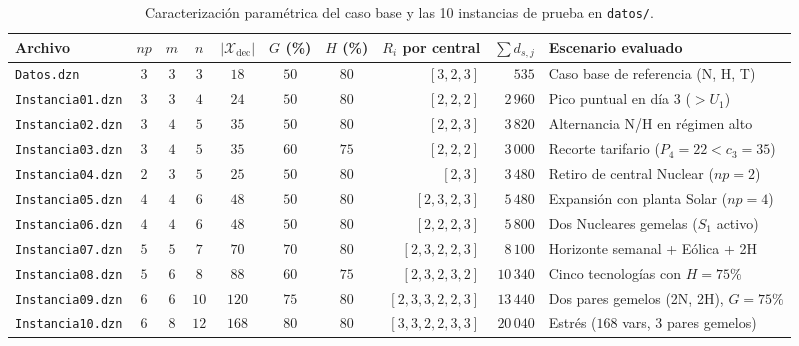\begin{table}[htbp]
    \centering
    \scriptsize
    \setlength{\tabcolsep}{3.2pt}
    \caption{Caracterización paramétrica del caso base y las 10 instancias de prueba en \texttt{datos/}.}
    \label{tab:diseno_instancias}
    \begin{tabular}{lccccccrrl}
        \toprule
        Archivo & $np$ & $m$ & $n$ & $|\mathcal{X}_{\text{dec}}|$ & $G$ (\%) & $H$ (\%) & $R_i$ por central & $\sum d_{s,j}$ & Escenario evaluado \\
        \midrule
        \texttt{Datos.dzn}       & $3$ & $3$ & $3$  & $18$  & $50$ & $80$ & $[3,2,3]$       & $535$     & Caso base de referencia (N, H, T) \\
        \texttt{Instancia01.dzn} & $3$ & $3$ & $4$  & $24$  & $50$ & $80$ & $[2,2,2]$       & $2\,960$  & Pico puntual en día 3 ($> U_1$) \\
        \texttt{Instancia02.dzn} & $3$ & $4$ & $5$  & $35$  & $50$ & $80$ & $[2,2,3]$       & $3\,820$  & Alternancia N/H en régimen alto \\
        \texttt{Instancia03.dzn} & $3$ & $4$ & $5$  & $35$  & $60$ & $75$ & $[2,2,2]$       & $3\,000$  & Recorte tarifario ($P_4=22 < c_3=35$) \\
        \texttt{Instancia04.dzn} & $2$ & $3$ & $5$  & $25$  & $50$ & $80$ & $[2,3]$         & $3\,480$  & Retiro de central Nuclear ($np=2$) \\
        \texttt{Instancia05.dzn} & $4$ & $4$ & $6$  & $48$  & $50$ & $80$ & $[2,3,2,3]$     & $5\,480$  & Expansión con planta Solar ($np=4$) \\
        \texttt{Instancia06.dzn} & $4$ & $4$ & $6$  & $48$  & $50$ & $80$ & $[2,2,2,3]$     & $5\,800$  & Dos Nucleares gemelas ($S_1$ activo) \\
        \texttt{Instancia07.dzn} & $5$ & $5$ & $7$  & $70$  & $70$ & $80$ & $[2,3,2,2,3]$   & $8\,100$  & Horizonte semanal + Eólica + 2H \\
        \texttt{Instancia08.dzn} & $5$ & $6$ & $8$  & $88$  & $60$ & $75$ & $[2,3,2,3,2]$   & $10\,340$ & Cinco tecnologías con $H=75\%$ \\
        \texttt{Instancia09.dzn} & $6$ & $6$ & $10$ & $120$ & $75$ & $80$ & $[2,3,3,2,2,3]$ & $13\,440$ & Dos pares gemelos (2N, 2H), $G=75\%$ \\
        \texttt{Instancia10.dzn} & $6$ & $8$ & $12$ & $168$ & $80$ & $80$ & $[3,3,2,2,3,3]$ & $20\,040$ & Estrés ($168$ vars, 3 pares gemelos) \\
        \bottomrule
    \end{tabular}
\end{table}

